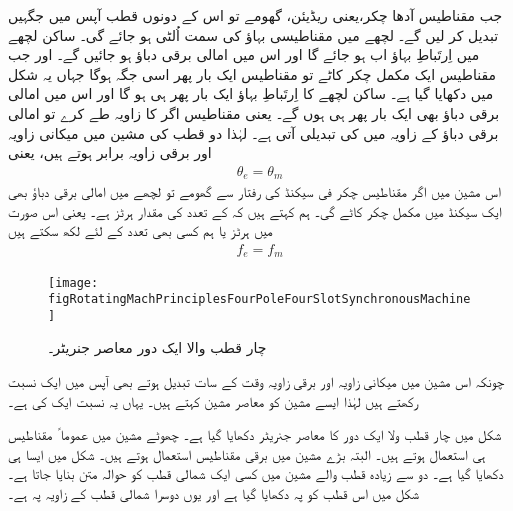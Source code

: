 جب مقناطیس آدھا چکر،یعنی  ریڈیئن،  گھومے تو اس کے دونوں  قطب آپس میں جگہیں تبدیل کر لیں گے۔ لچھے میں مقناطیسی بہاؤ کی سمت اُلٹی ہو جائے گی۔ ساکن لچھے میں اِرتَباطِ بہاؤ اب  ہو جائے گا اور اس میں امالی برقی دباؤ  ہو جائیں گے۔ اور جب مقناطیس ایک مکمل چکر کاٹے تو مقناطیس  ایک بار پھر اسی جگہ ہوگا جہاں یہ شکل میں دکھایا گیا ہے۔ ساکن لچھے کا اِرتَباطِ بہاؤ ایک بار پھر  ہی ہو گا اور اس میں امالی برقی دباؤ بھی ایک بار پھر  ہی ہوں گے۔ یعنی مقناطیس اگر  کا زاویہ طے کرے تو امالی برقی دباؤ کے زاویہ میں  کی تبدیلی آتی ہے۔ لہٰذا دو قطب کی مشین میں میکانی زاویہ  اور برقی زاویہ  برابر ہوتے ہیں، یعنی
\begin{align*}
\theta_e=\theta_m
\end{align*}
اس مشین میں اگر مقناطیس  چکر فی سیکنڈ کی رفتار سے گھومے تو لچھے میں امالی برقی دباؤ  بھی ایک سیکنڈ میں  مکمل چکر کاٹے گی۔ ہم کہتے ہیں کہ  کے تعدد    کی مقدار   ہرٹز ہے۔ یعنی اس صورت میں   ہرٹز  یا ہم کسی بھی تعدد کے لئے لکھ سکتے ہیں
\begin{align*}
f_e=f_m
\end{align*}
%
\begin{figure}
\centering
\texttt{[image: figRotatingMachPrinciplesFourPoleFourSlotSynchronousMachine]}
\caption{چار قطب والا ایک دور معاصر جنریٹر۔}
\label{شکل_گھومتے_مشین_چار_قطب_معاصر_مژین}
\end{figure}


چونکہ اس مشین میں  میکانی زاویہ  اور برقی زاویہ  وقت کے سات تبدیل ہوتے بھی آپس میں ایک نسبت رکھتے ہیں لہٰذا ایسے مشین کو معاصر مشین  کہتے ہیں۔ یہاں یہ نسبت ایک کی ہے۔ 

شکل   میں چار قطب ولا ایک دور کا معاصر جنریٹر دکھایا گیا ہے۔ چھوٹے مشین میں عموما ً مقناطیس ہی استعمال ہوتے ہیں۔ البتہ بڑے مشین میں برقی مقناطیس استعمال ہوتے ہیں۔ شکل   میں ایسا ہی دکھایا گیا ہے۔ دو سے زیادہ قطب والے مشین میں کسی ایک شمالی قطب کو حوالہ متن بنایا جاتا ہے۔ شکل میں اس قطب کو  پہ دکھایا گیا ہے اور یوں دوسرا شمالی قطب  کے زاویہ پہ ہے۔

